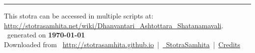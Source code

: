 \documentclass[a5paper,twoside,12pt]{book}
\begin{document}
\setmainfont[Script=Devanagari,Mapping=tex-text]{Sanskrit 2003}
\fontsize {16}{19.25}\selectfont
\let\head\chapt
\begin{center}

\end{center}
\vfill
\centering
\rule{0.8\textwidth}{0.6pt}

\footnotesize
{}\sffamily
This stotra can be accessed in multiple scripts at:\\
\url{http://stotrasamhita.net/wiki/Dhanvantari_Ashtottara_Shatanamavali}.\\[1ex]
\faFilePdfO~generated on \textbf{\today}\\[1ex]
Downloaded from \faGlobe{}~\url{http://stotrasamhita.github.io}~|~\href{https://github.com/StotraSamhita}{\faGithubSquare{}~StotraSamhita}~|~\href{https://stotrasamhita.github.io/about/}{Credits}
\end{document}
